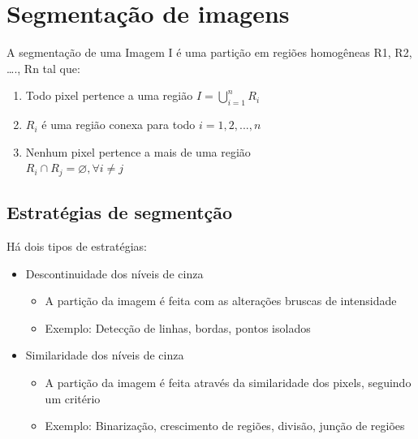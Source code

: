 \documentclass{article}
\begin{document}
\section{Segmentação de imagens}
\label{sec:segmentação}
A segmentação de uma Imagem I é uma partição em regiões homogêneas R1, R2, …., Rn tal que:
\begin{enumerate}
    \item Todo pixel pertence a uma região $I=\bigcup_{i=1}^nR_{i}$
    \item $R_{i}$ é uma região conexa para todo $i=1,2,...,n$
    \item Nenhum pixel pertence a mais de uma região \\
    $R_{i}\cap R_{j}=\varnothing, \forall i \neq j$
\end{enumerate}

\subsection{Estratégias de segmentção}
Há dois tipos de estratégias:
\begin{itemize}
    \item Descontinuidade dos níveis de cinza
    \begin{itemize}
        \item A partição da imagem é feita com as alterações bruscas de intensidade 
        \item Exemplo: Detecção de linhas, bordas, pontos isolados
    \end{itemize}
    \item  Similaridade dos níveis de cinza 
    \begin{itemize}
        \item A partição da imagem é feita através da similaridade dos pixels, seguindo um critério
        \item Exemplo: Binarização, crescimento de regiões, divisão, junção de regiões
    \end{itemize} 
\end{itemize}
\end{document}
